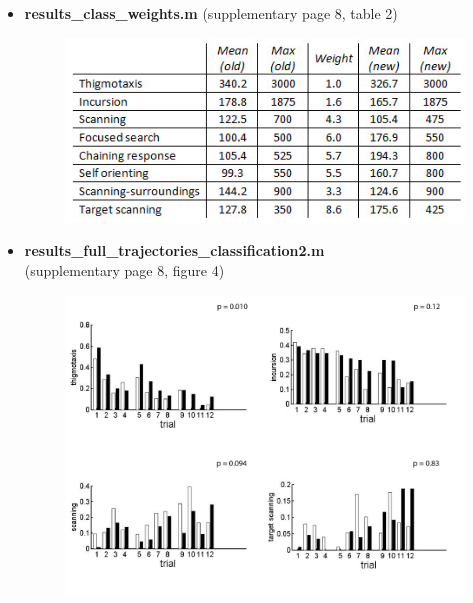 \documentclass[12pt,titlepage]{article}
\begin{document}
\begin{doublespace}
\begin{itemize}
\begin{figure}[H]
\begin{center}
		\label{code_stable1}
	\end{center}
\end{figure}
\item \textbf{results\_class\_weights.m}
(supplementary page 8, table 2)
\begin{figure}[H]
	\begin{center}
		\includegraphics[width=1\textwidth]{st2.jpg}\\
		\label{code_stable2}
	\end{center}
\end{figure}
\item \textbf{results\_full\_trajectories\_classification2.m}\\
(supplementary page 8, figure 4)
\begin{figure}[H]
	\begin{center}
		\includegraphics[width=1\textwidth]{sf4.jpg}\\
		\label{code_sfig4}
	\end{center}
\end{figure}

\end{itemize}
\end{doublespace}
\end{document}
